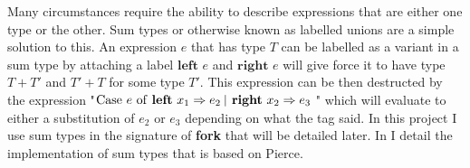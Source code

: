 \documentclass[12pt,twoside,notitlepage]{report}
\begin{document}
Many circumstances require the ability to describe expressions that are either one type or the other. Sum types or otherwise known as labelled unions are a simple solution to this. An expression $ e $ that has type $ T $ can be labelled as a variant in a sum type by attaching a label $ \textbf{left } e $ and $ \textbf{right } e $ will give force it to have type $ T + T' $ and $ T' + T $ for some type $ T' $. This expression can be then destructed by the expression "$ \textrm{Case $  e $ of \textbf{left} $ x_1 \Rightarrow e_2 $ \vline\, \textbf{right} $ x_2 \Rightarrow e_3 $ } $" which will evaluate to either a substitution of $ e_2 $ or $ e_3 $ depending on what the tag said. In this project I use sum types in the signature of \textbf{fork} that will be detailed later. In  I detail the implementation of sum types that is based on Pierce\cite[p.~132]{pierce2002types}. 
\end{document}
